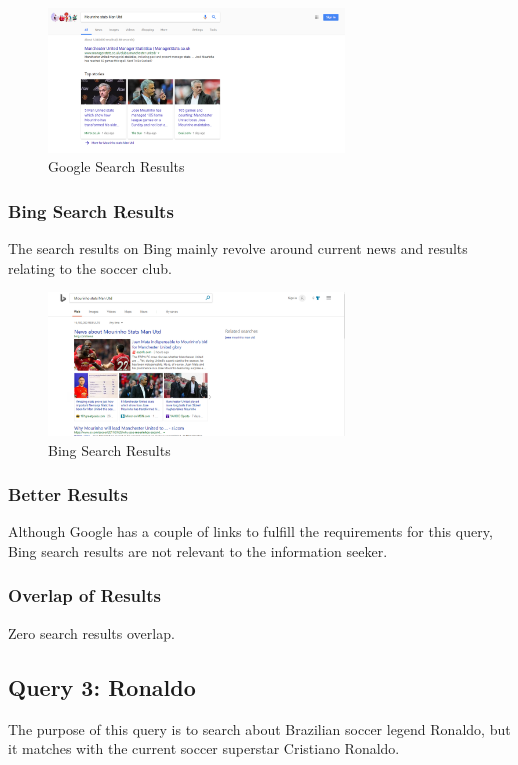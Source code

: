 \documentclass[12pt]{report}
\begin{document}
\begin{figure}[ht] 
  \centering
  \includegraphics[width=0.7\textwidth]{Query2_Google.PNG}
  \caption{Google Search Results}
  \label{fig:3}
\end{figure}

\subsubsection{Bing Search Results}
The search results on Bing mainly revolve around current news and results relating to the soccer club.

\begin{figure}[ht]
  \centering
  \includegraphics[width=0.7\textwidth]{Query2_Bing.PNG}
  \caption{Bing Search Results}
  \label{fig:4}
\end{figure}

\subsubsection{Better Results}
 Although Google has a couple of links to fulfill the requirements for this query, Bing search results are not relevant to the information seeker.
\subsubsection{Overlap of Results}
Zero search results overlap.

\subsection{Query 3: Ronaldo}
The purpose of this query is to search about Brazilian soccer legend Ronaldo, but it matches with the current soccer superstar Cristiano Ronaldo.
\end{document}
